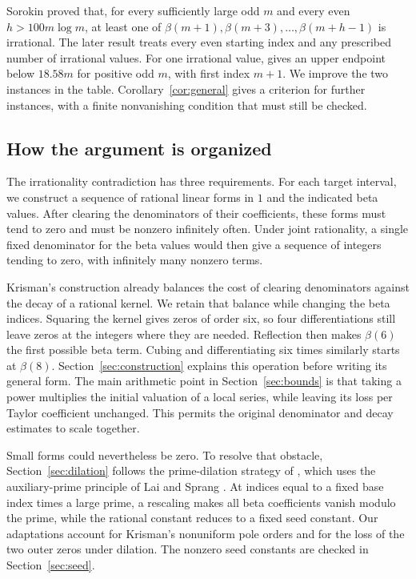 \documentclass[11pt]{article}
\begin{document}
Sorokin \cite[Theorem S]{sorokin} proved that, for every sufficiently
large odd $m$ and every even $h>100m\log m$, at least one of
$\beta(m+1),\beta(m+3),\ldots,\beta(m+h-1)$ is irrational.
The later result \cite[Theorem 1.2]{shifted} treats every even
starting index and any prescribed number of irrational values. For one
irrational value, \cite[Proposition B.1]{shifted} gives an upper endpoint below $18.58m$
for positive odd $m$, with first index $m+1$. We improve the two instances
in the table. Corollary~\ref{cor:general} gives a criterion for further
instances, with a finite nonvanishing condition that must still be checked.

\subsection*{How the argument is organized}
The irrationality contradiction has three requirements. For each target
interval, we construct a sequence of rational linear forms in $1$ and
the indicated beta values. After clearing the denominators of their
coefficients, these forms must tend to zero and must be nonzero infinitely
often. Under joint
rationality, a single fixed denominator for the beta values would then
give a sequence of integers tending to zero, with infinitely many nonzero
terms.

Krisman's construction already balances the cost of clearing denominators
against the decay of a rational kernel. We retain that balance while
changing the beta indices. Squaring the kernel gives zeros of order six,
so four differentiations still leave zeros at the integers where they are
needed. Reflection then makes $\beta(6)$ the first possible beta term.
Cubing and differentiating six times similarly starts at $\beta(8)$.
Section~\ref{sec:construction} explains this operation before writing its
general form. The main arithmetic point in Section~\ref{sec:bounds} is
that taking a power multiplies the initial valuation of a local series,
while leaving its loss per Taylor coefficient unchanged. This permits
the original denominator and decay estimates to scale together.

Small forms could nevertheless be zero. To resolve that obstacle,
Section~\ref{sec:dilation} follows the prime-dilation strategy of
\cite[Section 6]{shifted}, which uses the auxiliary-prime principle
of Lai and Sprang \cite[Lemma 2.3]{laisprang}. At indices equal to a fixed base
index times a large prime, a rescaling makes all beta coefficients
vanish modulo the prime, while the rational constant reduces to a fixed
seed constant. Our adaptations account for Krisman's nonuniform pole
orders and for the loss of the two outer zeros under dilation. The
nonzero seed constants are checked in Section~\ref{sec:seed}.
\end{document}
